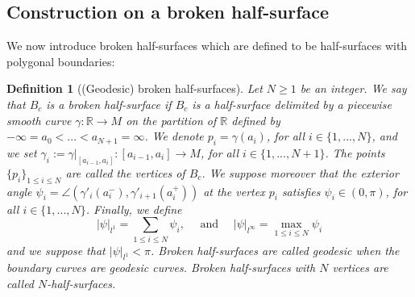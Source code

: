 \documentclass{article}
\newcommand{\R}{\mathbb{R}}
\newcommand{\surf}{M}
\newcommand{\halfP}{B}
\newcommand{\psim}{|\psi|_{l^\infty}}
\newcommand{\psitot}{|\psi|_{l^1}}
\newtheorem{definitionE}[theorem]{Definition}
\theoremstyle{remark}
\theoremstyle{prpart}
\begin{document}
\subsection{Construction on a broken half-surface}\label{subsubsec:half-surfaces-to-sector}
We now introduce broken half-surfaces which are defined to be half-surfaces with polygonal boundaries:
\begin{definitionE}[(Geodesic) broken half-surfaces]\label{def:n-half-surfaces}
  Let $N\geq 1$ be an integer. We say that $\halfP_c$ is a \emph{broken half-surface} if $\halfP_c$ is a half-surface delimited by a piecewise smooth curve $\gamma:\R\to\surf$ on the partition of $\R$ defined by $-\infty=a_0<...<a_{N+1}=\infty$. We denote $p_i=\gamma(a_i)$, for all $i\in\{1,...,N\}$, and we set $\gamma_i:=\gamma\big|_{[a_{i-1},a_i]}:[a_{i-1},a_i]\to\surf$, for all $i\in\{1,...,N+1\}$. The points $\{p_i\}_{1\leq i\leq N}$ are called the vertices of $\halfP_c$. We suppose moreover that the exterior angle $\psi_i = \angle(\gamma'_{i}(a_i^-), \gamma'_{i+1}(a_i^+))$ at the vertex $p_i$ satisfies $\psi_i\in(0,\pi)$, for all $i\in\{1,...,N\}$. Finally, we define
\begin{equation*}
\psitot=\sum_{1\leq i\leq N}\psi_i,\quad\text{ and }\quad \psim = \max_{1\leq i\leq N}\psi_i
\end{equation*}
and we suppose that $\psitot<\pi$. \emph{Broken half-surfaces} are called geodesic when the boundary curves are geodesic curves. Broken half-surfaces with $N$ vertices are called \emph{$N$-half-surfaces}.
\end{definitionE}
\end{document}
